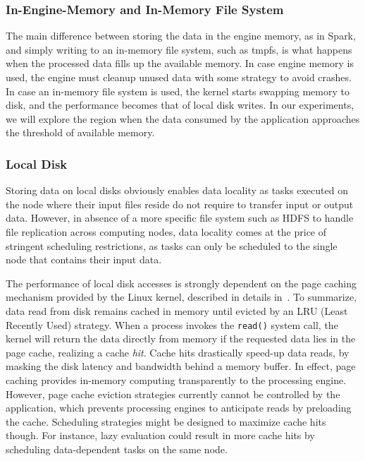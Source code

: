 \documentclass{IEEEtran}
\begin{document}
\subsubsection{In-Engine-Memory and In-Memory File System} 

 The main difference between storing the data in the engine memory, as in Spark, 
 and simply writing to an in-memory file system, such as tmpfs, is 
 what happens when the processed data fills up the available 
 memory. In case engine memory is used, the engine must cleanup 
 unused data with some strategy to avoid crashes. In case an in-memory 
 file system is used, the kernel starts swapping memory to disk, and 
 the performance becomes that of local disk writes. In our experiments, 
 we will explore the region  when the data consumed by the 
 application approaches the threshold of available memory.

\subsubsection{Local Disk} %




Storing data on local disks obviously enables data locality as tasks 
executed on the node where their input files reside do not require to 
transfer input or output data. However, in absence of a more specific 
file system such as HDFS to handle 
file replication across computing nodes, data locality comes at the price
of stringent scheduling restrictions, as tasks can only be scheduled to the
single node that contains their input data.

The performance of local disk accesses is strongly dependent on the 
page caching mechanism provided by the Linux kernel, described in    
details in~\cite{love2010linux}. To summarize, data read from disk 
remains cached in memory until evicted by an LRU (Least Recently Used) 
strategy. When a process invokes the \texttt{read()} system call, the 
kernel will return the data directly from memory if the requested data 
lies in the page cache, realizing a cache \emph{hit}. Cache hits drastically speed-up data 
reads, by masking the disk latency and bandwidth behind a 
memory buffer. In effect, page caching provides in-memory computing 
transparently to the processing engine. However, page cache eviction 
strategies currently cannot be controlled by the application, which 
prevents processing engines to anticipate reads by preloading the 
cache. Scheduling strategies might be designed 
to maximize cache hits though. For instance, lazy 
evaluation could result in more cache hits by scheduling data-dependent 
tasks on the same node.
\end{document}
